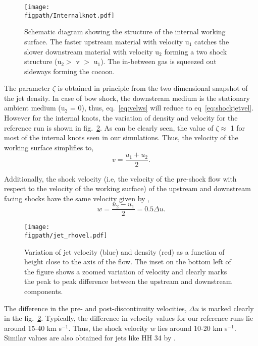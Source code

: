 \documentclass[useAMS,usenatbib]{mn2e}
\newcommand{\figpath}{/Users/bhargavvaidya/MyProject/work/Leeds_Uni/SiOJets_New/PAPER/PFIGS/}
\begin{document}
\begin{figure}
\texttt{[image: \\figpath/Internalknot.pdf]}
\caption{Schematic diagram showing the structure of the internal
  working surface. The faster upstream material with velocity u$_1$
  catches the slower downstream material with velocity u$_2$ forming a
two shock structure (u$_2 >$ v $>$ u$_1$). The in-between gas is squeezed out sideways
forming the cocoon.}
\label{fig:interknot}
\end{figure}

The parameter $\zeta$ is obtained in principle from the two
dimensional snapshot of the jet density. In case of bow shock, the
downstream medium is the stationary ambient medium (u$_2$ = 0), thus,
eq.~\ref{eq:velws} will reduce to eq~\ref{eq:shockjetvel}.
However for the internal knots, the variation of density and
velocity for the reference run is shown in fig.~\ref{fig:1dvelrho}.
As can be clearly seen, the value of $\zeta \approx$ 1 for most of the
internal knots seen in our simulations. Thus, the velocity of the
working surface simplifies to, 
\begin{equation}
v = \frac{u_1 + u_2}{2}.
\label{eq:velwssimple}
\end{equation}

Additionally, the shock velocity (i.e, the velocity of the pre-shock
flow with respect to the velocity of the working surface) of the
upstream and downstream facing shocks have the same velocity given by \cite{Raga:1990p16416},
\begin{equation}
w = \frac{u_2 - u_1}{2} = 0.5\Delta u.
\label{eq:shkvelws}
\end{equation}

\begin{figure}
\texttt{[image: \\figpath/jet\_rhovel.pdf]}
\caption{Variation of jet velocity (blue) and density (red) as a
  function of height close to the axis of the flow. The inset on the
  bottom left of the figure shows a zoomed variation of velocity and
  clearly marks the peak to peak difference between the upstream and
  downstream components.}
\label{fig:1dvelrho}
\end{figure}


The difference in the pre- and post-discontinuity velocities, $\Delta
u$ is marked clearly in the fig.~\ref{fig:1dvelrho}. Typically, the
difference in velocity values for our reference runs lie around 15-40 km s$^{-1}$. Thus, the
shock velocity $w$ lies around 10-20 km s$^{-1}$. Similar values are
also obtained for jets like HH 34 by \cite{Raga:1992p16392}.
\end{document}
